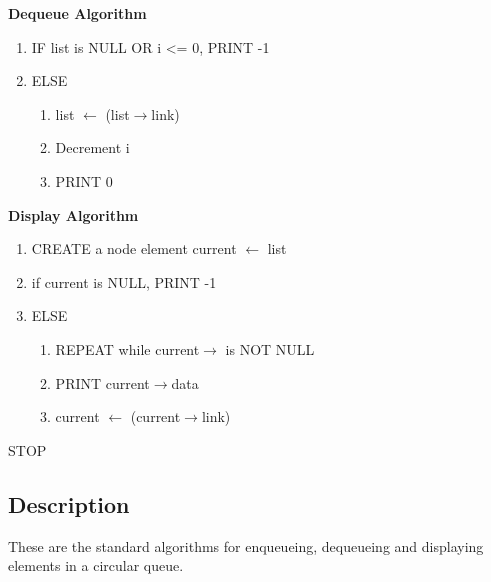 \documentclass{article}
\begin{document}
\begin{flushleft}
\textbf{Dequeue Algorithm}
\begin{enumerate}
    \item IF list is NULL OR i <= 0, PRINT -1
    \item ELSE 
    \begin{enumerate}
        \item list $\leftarrow$ (list$\rightarrow$link)
        \item Decrement i
        \item PRINT 0
    \end{enumerate}
\end{enumerate}
\textbf{Display Algorithm}
\begin{enumerate}
    \item CREATE a node element current $\leftarrow$ list
    \item if current is NULL, PRINT -1
    \item ELSE
    \begin{enumerate}
        \item REPEAT while current$\rightarrow$ is NOT NULL
        \item PRINT current$\rightarrow$data
        \item current $\leftarrow$ (current$\rightarrow$link)
    \end{enumerate}
\end{enumerate}
STOP
\end{flushleft}
\subsection{Description}
These are the standard algorithms for enqueueing, dequeueing and displaying elements in a circular queue.
\end{document}
